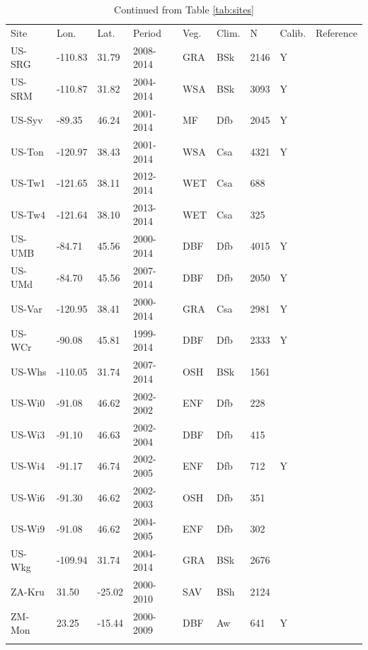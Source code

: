 \documentclass[gmd, manuscript]{copernicus}
\begin{document}
\begin{table}[t]
\caption{Continued from Table \ref{tab:sites}} 
\begin{tabular}{lllllllll}
  \tophline
  Site & Lon. & Lat. & Period & Veg. & Clim. & N & Calib. & Reference \\ 
  \middlehline  
  US-SRG & -110.83 & 31.79 & 2008-2014 & GRA & BSk & 2146 & Y & \citet{US-SRG} \\ 
  US-SRM & -110.87 & 31.82 & 2004-2014 & WSA & BSk & 3093 & Y & \citet{US-SRM} \\ 
  US-Syv & -89.35 & 46.24 & 2001-2014 & MF & Dfb & 2045 & Y & \citet{US-Syv} \\ 
  US-Ton & -120.97 & 38.43 & 2001-2014 & WSA & Csa & 4321 & Y & \citet{US-Ton} \\ 
  US-Tw1 & -121.65 & 38.11 & 2012-2014 & WET & Csa & 688 &  & \citet{US-Tw1} \\ 
  US-Tw4 & -121.64 & 38.10 & 2013-2014 & WET & Csa & 325 &  & \citet{US-Tw4} \\ 
  US-UMB & -84.71 & 45.56 & 2000-2014 & DBF & Dfb & 4015 & Y & \citet{US-UMB} \\ 
  US-UMd & -84.70 & 45.56 & 2007-2014 & DBF & Dfb & 2050 & Y & \citet{US-UMd} \\ 
  US-Var & -120.95 & 38.41 & 2000-2014 & GRA & Csa & 2981 & Y & \citet{US-Var} \\ 
  US-WCr & -90.08 & 45.81 & 1999-2014 & DBF & Dfb & 2333 & Y & \citet{US-WCr} \\ 
  US-Whs & -110.05 & 31.74 & 2007-2014 & OSH & BSk & 1561 &  & \citet{US-Whs} \\ 
  US-Wi0 & -91.08 & 46.62 & 2002-2002 & ENF & Dfb & 228 &  & \citet{US-Wi0} \\ 
  US-Wi3 & -91.10 & 46.63 & 2002-2004 & DBF & Dfb & 415 &  & \citet{US-Wi3} \\ 
  US-Wi4 & -91.17 & 46.74 & 2002-2005 & ENF & Dfb & 712 & Y & \citet{US-Wi4} \\ 
  US-Wi6 & -91.30 & 46.62 & 2002-2003 & OSH & Dfb & 351 &  & \citet{US-Wi6} \\ 
  US-Wi9 & -91.08 & 46.62 & 2004-2005 & ENF & Dfb & 302 &  & \citet{US-Wi9} \\ 
  US-Wkg & -109.94 & 31.74 & 2004-2014 & GRA & BSk & 2676 &  & \citet{US-Wkg} \\ 
  ZA-Kru & 31.50 & -25.02 & 2000-2010 & SAV & BSh & 2124 &  & \citet{ZA-Kru} \\ 
  ZM-Mon & 23.25 & -15.44 & 2000-2009 & DBF & Aw & 641 & Y & \citet{ZM-Mon} \\ 
  \bottomhline
\end{tabular}
\label{tab:sites4}
\end{table}
\clearpage
\end{document}
